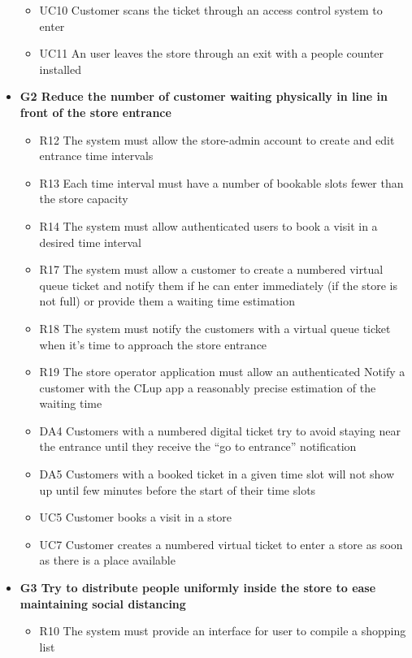 \begin{itemize}
\begin{itemize}
        \medskip
        \item UC10 Customer scans the ticket through an access control system to enter
        \item UC11 An user leaves the store through an exit with a people counter installed
    \end{itemize}
    \item \textbf{G2 Reduce the number of customer waiting physically in line in front of the store entrance}
    \begin{itemize}
        \item R12 The system must allow the store-admin account to create and edit entrance time intervals
        \item R13 Each time interval must have a number of bookable slots fewer than the store capacity
        \item R14 The system must allow authenticated users to book a visit in a desired time interval
        \item R17 The system must allow a customer to create a numbered virtual queue ticket and notify them if he can enter immediately (if the store is not full) or provide them a waiting time estimation
        \item R18 The system must notify the customers with a virtual queue ticket when it’s time to approach the store entrance
        \item R19 The store operator application must allow an authenticated Notify a customer with the CLup app a reasonably precise estimation of the waiting time
        \item DA4 Customers with a numbered digital ticket try to avoid staying near the entrance until they receive the “go to entrance” notification
        \item DA5 Customers with a booked ticket in a given time slot will not show up until few minutes before the start of their time slots
        \medskip
        \item UC5 Customer books a visit in a store
        \item UC7 Customer creates a numbered virtual ticket to enter a store as soon as there is a place available
    \end{itemize}
    \item \textbf{G3 Try to distribute people uniformly inside the store to ease maintaining social distancing}
    \begin{itemize}
        \item R10 The system must provide an interface for user to compile a shopping list    

\end{itemize}
\end{itemize}

